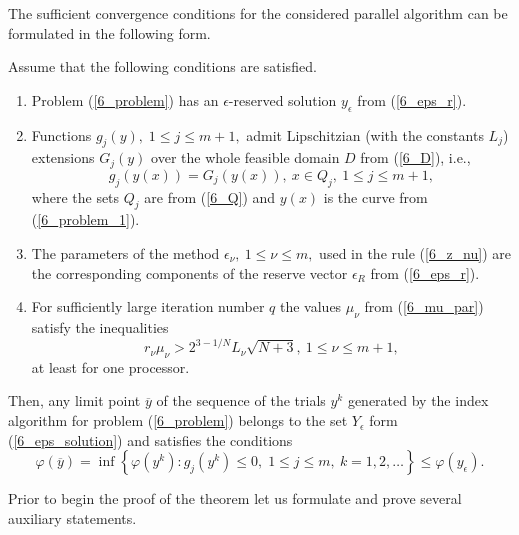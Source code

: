 The sufficient convergence conditions for the considered parallel algorithm can be formulated in the following form.
\begin{theorem}\label{6_theorem}
Assume that the following conditions are satisfied.

\begin{enumerate}
	\item Problem (\ref{6_problem}) has an $\epsilon$-reserved solution $y_\epsilon$ from (\ref{6_eps_r}).
	\item Functions $g_j(y),\; 1\leq j\leq m+1,$ admit Lipschitzian (with the constants $L_j$) extensions $G_j(y)$ over the whole feasible domain $D$ from (\ref{6_D}), i.e.,
	\begin{equation}\label{6_lip_ext}
	g_j(y(x))=G_j(y(x)),\ x\in Q_j,\ 1\leq j\leq m+1,
	\end{equation}
	where the sets $Q_j$ are from (\ref{6_Q}) and $y(x)$ is the curve from (\ref{6_problem_1}).	
	\item The parameters of the method $\epsilon_\nu,\ 1\leq \nu \leq m,$ used in the rule (\ref{6_z_nu}) are the corresponding components of the reserve vector $\epsilon_R$ from (\ref{6_eps_r}).
	\item For sufficiently large iteration number $q$  the values $\mu_\nu$ from (\ref{6_mu_par}) satisfy the inequalities 
	\begin{equation}\label{6_inequalities}
	r_\nu\mu_\nu > 2^{3-1/N}L_\nu \sqrt{N+3},\ 1\leq \nu \leq m+1,	
	\end{equation}
	at least for one processor.
\end{enumerate}
Then, any limit point $\overline{y}$  of the sequence of the trials ${y^k}$ generated by the index algorithm for problem (\ref{6_problem}) belongs to the set $Y_\epsilon$ form (\ref{6_eps_solution}) and satisfies the conditions
	\begin{equation}\label{6_conditions}
	\varphi(\overline{y})=\inf \left\{\varphi(y^k):g_j(y^k)\leq 0, \; 1\leq j\leq m,\ k=1,2,\dots \right\}\leq \varphi(y_\epsilon).	
	\end{equation}
\end{theorem}
Prior to begin the proof of the theorem let us formulate and prove several auxiliary statements.
